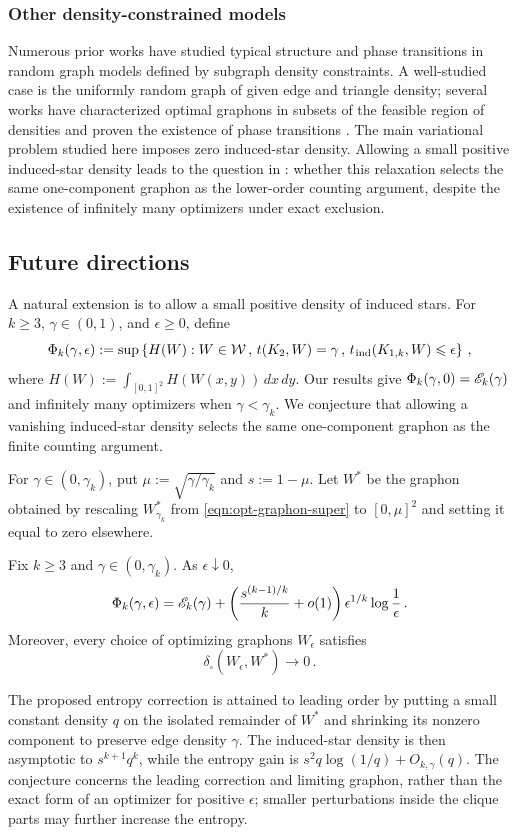 \subsubsection{Other density-constrained models}
Numerous prior works have studied typical structure and phase transitions in random graph models defined by subgraph density constraints. A well-studied case is the uniformly random graph of given edge and triangle density; several works have characterized optimal graphons in subsets of the feasible region of densities and proven the existence of phase transitions \cite{radin2013phase,radin2014asymptotics,radin2015singularities}. The main variational problem studied here imposes zero induced-star density. Allowing a small positive induced-star density leads to the question in : whether this relaxation selects the same one-component graphon as the lower-order counting argument, despite the existence of infinitely many optimizers under exact exclusion.

\subsection{Future directions}
A natural extension is to allow a small positive density of induced stars. For $k\geq3$, $\gamma\in(0,1)$, and $\epsilon\geq0$, define
$$\Phi_k(\gamma,\epsilon):=\sup\left\{H(W):W\in{\mathcal W}\,,\,t(K_2,W)=\gamma\,,\,t_{\hspace{0.2mm}\mathrm{ind}}(K_{1,k},W)\leqslant\epsilon\right\}\,,$$
where $H(W):=\int_{[0,1]^2}H(W(x,y))\,dx\,dy$. Our results give $\Phi_k(\gamma,0)={\mathscr E}_k(\gamma)$ and infinitely many optimizers when $\gamma<\gamma_k$. We conjecture that allowing a vanishing induced-star density selects the same one-component graphon as the finite counting argument.

For $\gamma\in(0,\gamma_k)$, put $\mu:=\sqrt{\gamma/\gamma_k}$ and $s:=1-\mu$. Let $W^\ast$ be the graphon obtained by rescaling $W^\ast_{\gamma_k}$ from \eqref{eqn:opt-graphon-super} to $[0,\mu]^2$ and setting it equal to zero elsewhere.

\begin{conjecture}\label{conj:relaxed-star-exclusion}
Fix $k\geq3$ and $\gamma\in(0,\gamma_k)$. As $\epsilon\downarrow0$,
$$\Phi_k(\gamma,\epsilon)={\mathscr E}_k(\gamma)+\left(\frac{s^{(k-1)/k}}{k}+o(1)\right)\epsilon^{1/k}\log\frac1\epsilon\,.$$
Moreover, every choice of optimizing graphons $W_\epsilon$ satisfies
$$\delta_\square(W_\epsilon,W^\ast)\longrightarrow0\,.$$
\end{conjecture}

The proposed entropy correction is attained to leading order by putting a small constant density $q$ on the isolated remainder of $W^\ast$ and shrinking its nonzero component to preserve edge density $\gamma$. The induced-star density is then asymptotic to $s^{k+1}q^k$, while the entropy gain is $s^2q\log(1/q)+O_{k,\gamma}(q)$. The conjecture concerns the leading correction and limiting graphon, rather than the exact form of an optimizer for positive $\epsilon$; smaller perturbations inside the clique parts may further increase the entropy.


